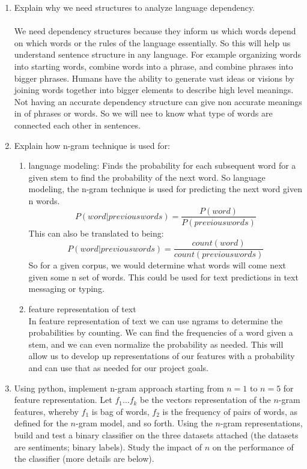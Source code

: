 \documentclass[12pt]{article}
\begin{document}
\begin{enumerate}
    \item Explain why we need structures to analyze language dependency.\\\\
    
    We need dependency structures because they inform us which words depend on which words or the rules of the language essentially. So this will help us understand sentence structure in any language. For example organizing words into starting words, combine words into a phrase, and combine phrases into bigger phrases. Humans have the ability to generate vast ideas or visions by joining words together into bigger elements to describe high level meanings. Not having an accurate dependency structure can give non accurate meanings in of phrases or words. So we will nee to know what type of words are connected each other in sentences.
    
    \item Explain how n-gram technique is used for:
        \begin{enumerate}
            \item language modeling: Finds the probability for each subsequent word for a given stem to find the probability of the next word. So language modeling, the n-gram technique is used for predicting the next word given n words. 
$$ P(word | previous words) = \frac{P(word)}{P(previous words)} $$
This can also be translated to being:
$$ P(word | previous words) = \frac{count(word)}{count(previous words)} $$
         So for a given corpus, we would determine what words will come next given some n set of words. This could be used for text predictions in text messaging or typing.
            \item feature representation of text \\ 
            In feature representation of text we can use ngrams to determine the probabilities by counting. We can find the frequencies of a word given a stem, and we can even normalize the probability as needed. This will allow us to develop up representations of our features with a probability and can use that as needed for our project goals. 
          
            
        \end{enumerate}
    \item Using python, implement n-gram approach starting from $n = 1$ to $n = 5$ for feature representation. Let $f_1\dots f_k$ be the vectors representation of the $n$-gram features, whereby $f_1$ is bag of words,  $f_2$ is the frequency of pairs of words, as defined for the $n$-gram model, and so forth. Using the $n$-gram representations, build and test a binary classifier on the three datasets attached (the datasets are sentiments; binary labels). Study the impact of $n$ on the performance of the classifier (more details are below). 


\end{enumerate}
\end{document}
